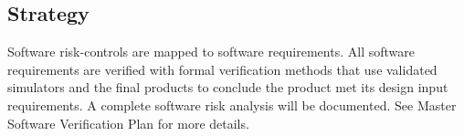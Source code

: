 \subsection{Strategy}
Software \gls{risk-control}s are mapped to software requirements. All software
requirements are verified with formal verification methods that use validated
simulators and the final products to conclude the product met its design input
requirements. A complete software risk analysis will be documented. See Master
Software Verification Plan for more details.
